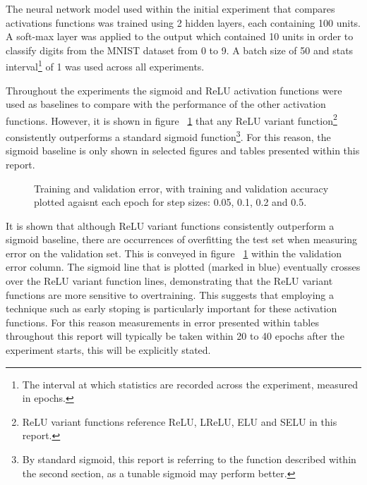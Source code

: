 \documentclass{article}
\begin{document}
The neural network model used within the initial experiment that compares activations functions was trained using 2 hidden layers, each containing 100 units. A soft-max layer was applied to the output which contained 10 units in order to classify digits from the MNIST dataset from 0 to 9. A batch size of 50 and stats interval\footnote{The interval at which statistics are recorded across the experiment, measured in epochs.} of 1 was used across all experiments.

Throughout the experiments the sigmoid and ReLU activation functions were used as baselines to compare with the performance of the other activation functions. However, it is shown in figure ~\ref{fig:sigmoid-vs-relu} that any ReLU variant function\footnote{ReLU variant functions reference ReLU, LReLU, ELU and SELU in this report.} consistently outperforms a standard sigmoid function\footnote{By standard sigmoid, this report is referring to the function described within the second section, as a tunable sigmoid may perform better.}. For this reason, the sigmoid baseline is only shown in selected figures and tables presented within this report.

\begin{figure}[tb]
\vskip 5mm
\begin{center}
\centerline{}
\caption{Training and validation error, with training and validation accuracy plotted agaisnt each epoch for step sizes: 0.05, 0.1, 0.2 and 0.5.}
\label{fig:sigmoid-vs-relu}
\end{center}
\vskip -5mm
\end{figure} 

It is shown that although ReLU variant functions consistently outperform a sigmoid baseline, there are occurrences of overfitting the test set when measuring error on the validation set. This is conveyed in figure ~\ref{fig:sigmoid-vs-relu} within the validation error column. The sigmoid line that is plotted (marked in blue) eventually crosses over the ReLU variant function lines, demonstrating that the ReLU variant functions are more sensitive to overtraining. This suggests that employing a technique such as early stoping is particularly important for these activation functions. For this reason measurements in error presented within tables throughout this report will typically be taken within 20 to 40 epochs after the experiment starts, this will be explicitly stated.
\end{document}
